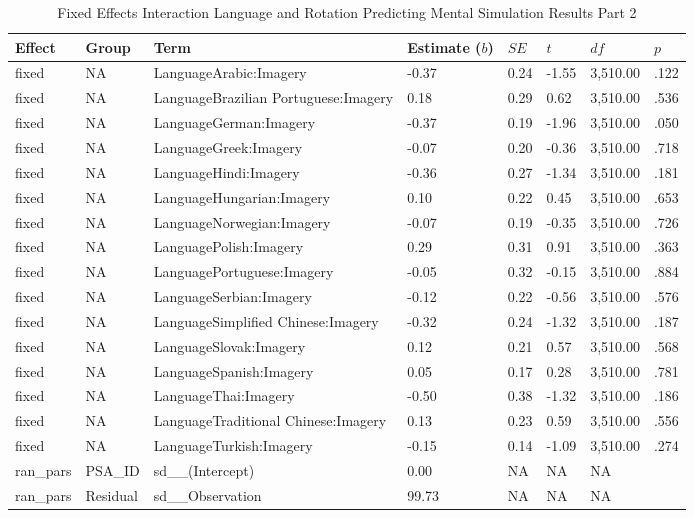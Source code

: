 \documentclass[
  man,floatsintext]{apa7}
\begin{document}
\begin{table}[tbp]

\begin{center}
\begin{threeparttable}

\caption{\label{tab:pred_interact_2}Fixed Effects Interaction Language and Rotation Predicting Mental Simulation Results Part 2}

\footnotesize{

\begin{tabular}{llllllll}
\toprule
Effect & Group & Term & Estimate ($b$) & $SE$ & $t$ & $df$ & $p$\\
\midrule
fixed & NA & LanguageArabic:Imagery & -0.37 & 0.24 & -1.55 & 3,510.00 & .122\\
fixed & NA & LanguageBrazilian Portuguese:Imagery & 0.18 & 0.29 & 0.62 & 3,510.00 & .536\\
fixed & NA & LanguageGerman:Imagery & -0.37 & 0.19 & -1.96 & 3,510.00 & .050\\
fixed & NA & LanguageGreek:Imagery & -0.07 & 0.20 & -0.36 & 3,510.00 & .718\\
fixed & NA & LanguageHindi:Imagery & -0.36 & 0.27 & -1.34 & 3,510.00 & .181\\
fixed & NA & LanguageHungarian:Imagery & 0.10 & 0.22 & 0.45 & 3,510.00 & .653\\
fixed & NA & LanguageNorwegian:Imagery & -0.07 & 0.19 & -0.35 & 3,510.00 & .726\\
fixed & NA & LanguagePolish:Imagery & 0.29 & 0.31 & 0.91 & 3,510.00 & .363\\
fixed & NA & LanguagePortuguese:Imagery & -0.05 & 0.32 & -0.15 & 3,510.00 & .884\\
fixed & NA & LanguageSerbian:Imagery & -0.12 & 0.22 & -0.56 & 3,510.00 & .576\\
fixed & NA & LanguageSimplified Chinese:Imagery & -0.32 & 0.24 & -1.32 & 3,510.00 & .187\\
fixed & NA & LanguageSlovak:Imagery & 0.12 & 0.21 & 0.57 & 3,510.00 & .568\\
fixed & NA & LanguageSpanish:Imagery & 0.05 & 0.17 & 0.28 & 3,510.00 & .781\\
fixed & NA & LanguageThai:Imagery & -0.50 & 0.38 & -1.32 & 3,510.00 & .186\\
fixed & NA & LanguageTraditional Chinese:Imagery & 0.13 & 0.23 & 0.59 & 3,510.00 & .556\\
fixed & NA & LanguageTurkish:Imagery & -0.15 & 0.14 & -1.09 & 3,510.00 & .274\\
ran\_pars & PSA\_ID & sd\_\_(Intercept) & 0.00 & NA & NA & NA & \\
ran\_pars & Residual & sd\_\_Observation & 99.73 & NA & NA & NA & \\
\bottomrule
\end{tabular}

}

\end{threeparttable}
\end{center}

\end{table}
\end{document}
